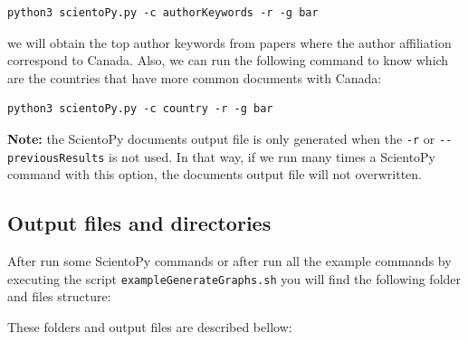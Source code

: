 \documentclass[10pt,letterpaper]{article}
\begin{document}
\begin{verbatim}
python3 scientoPy.py -c authorKeywords -r -g bar
\end{verbatim}

we will obtain the top author keywords from papers where the author affiliation correspond to Canada. Also, we can run the following command to know which are the countries that have more common documents with Canada:

\begin{verbatim}
python3 scientoPy.py -c country -r -g bar
\end{verbatim}

\textbf{Note:} the ScientoPy documents output file is only generated when the \verb|-r| or \verb|--previousResults| is not used. In that way, if we run many times a ScientoPy command with this option, the documents output file will not overwritten.

\subsection{Output files and directories}

After run some ScientoPy commands or after run all the example commands by executing the script \verb|exampleGenerateGraphs.sh| you will find the following folder and files structure:

\vspace*{0.5cm}

These folders and output files are described bellow:
\end{document}
